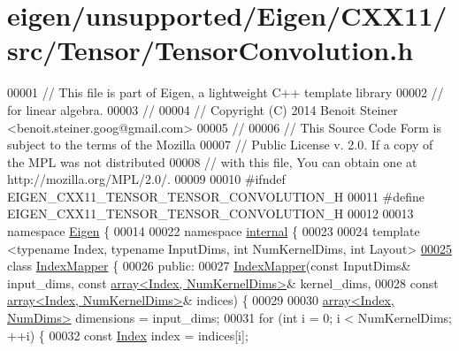 \hypertarget{eigen_2unsupported_2_eigen_2_c_x_x11_2src_2_tensor_2_tensor_convolution_8h_source}{}\section{eigen/unsupported/\+Eigen/\+C\+X\+X11/src/\+Tensor/\+Tensor\+Convolution.h}
\label{eigen_2unsupported_2_eigen_2_c_x_x11_2src_2_tensor_2_tensor_convolution_8h_source}

\begin{DoxyCode}
00001 \textcolor{comment}{// This file is part of Eigen, a lightweight C++ template library}
00002 \textcolor{comment}{// for linear algebra.}
00003 \textcolor{comment}{//}
00004 \textcolor{comment}{// Copyright (C) 2014 Benoit Steiner <benoit.steiner.goog@gmail.com>}
00005 \textcolor{comment}{//}
00006 \textcolor{comment}{// This Source Code Form is subject to the terms of the Mozilla}
00007 \textcolor{comment}{// Public License v. 2.0. If a copy of the MPL was not distributed}
00008 \textcolor{comment}{// with this file, You can obtain one at http://mozilla.org/MPL/2.0/.}
00009 
00010 \textcolor{preprocessor}{#ifndef EIGEN\_CXX11\_TENSOR\_TENSOR\_CONVOLUTION\_H}
00011 \textcolor{preprocessor}{#define EIGEN\_CXX11\_TENSOR\_TENSOR\_CONVOLUTION\_H}
00012 
00013 \textcolor{keyword}{namespace }\hyperlink{namespace_eigen}{Eigen} \{
00014 
00022 \textcolor{keyword}{namespace }\hyperlink{namespaceinternal}{internal} \{
00023 
00024 \textcolor{keyword}{template} <\textcolor{keyword}{typename} Index, \textcolor{keyword}{typename} InputDims, \textcolor{keywordtype}{int} NumKernelDims, \textcolor{keywordtype}{int} Layout>
\hyperlink{class_eigen_1_1internal_1_1_index_mapper}{00025} \textcolor{keyword}{class }\hyperlink{class_eigen_1_1internal_1_1_index_mapper}{IndexMapper} \{
00026  \textcolor{keyword}{public}:
00027   \hyperlink{class_eigen_1_1internal_1_1_index_mapper}{IndexMapper}(\textcolor{keyword}{const} InputDims& input\_dims, \textcolor{keyword}{const} 
      \hyperlink{class_eigen_1_1array}{array<Index, NumKernelDims>}& kernel\_dims,
00028               \textcolor{keyword}{const} \hyperlink{class_eigen_1_1array}{array<Index, NumKernelDims>}& indices) \{
00029 
00030     \hyperlink{class_eigen_1_1array}{array<Index, NumDims>} dimensions = input\_dims;
00031     \textcolor{keywordflow}{for} (\textcolor{keywordtype}{int} i = 0; i < NumKernelDims; ++i) \{
00032       \textcolor{keyword}{const} \hyperlink{namespace_eigen_a62e77e0933482dafde8fe197d9a2cfde}{Index} index = indices[i];

\end{DoxyCode}

